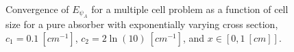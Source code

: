 \begin{figure}[!htp]
\begin{center}
{}
\end{center}
\caption{Convergence of $E_{\psi_A}$ for a multiple cell problem as a function of cell size for a pure absorber with exponentially varying cross section, $c_1 = 0.1~[cm^{-1}]$, $c_2 = 2\ln(10)~[cm^{-1}]$, and $x\in \left[0,1~[cm] \right]$.}
\label{fig:varxs_psi_A}
\end{figure}
%
%
%
